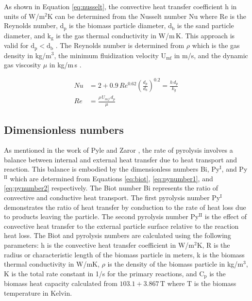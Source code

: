 As shown in Equation \ref{eq:nusselt}, the convective heat transfer coefficient h in units of W/m$^2$K can be determined from the Nusselt number Nu where Re is the Reynolds number, d$_\text{p}$ is the biomass particle diameter, d$_\text{b}$ is the sand particle diameter, and k$_\text{g}$ is the gas thermal conductivity in W/m\,K. This approach is valid for $\text{d}_\text{p} < \text{d}_\text{b}$ \cite{Collier-2004}. The Reynolds number is determined from $\rho$ which is the gas density in kg/m$^3$, the minimum fluidization velocity U$_\text{mf}$ in m/s, and the dynamic gas viscosity $\mu$ in kg/m\,s \cite{Papadikis-2010}.

\begin{align}
    Nu &= 2 + 0.9\, Re^{0.62} \left(\frac{d_p}{d_b}\right)^{0.2} = \frac{h\, d_p}{k_g} \label{eq:nusselt} \\
    Re &= \frac{\rho\, U_{mf}\, d_p}{\mu}
\end{align}


\subsection{Dimensionless numbers}

As mentioned in the work of Pyle and Zaror \cite{Pyle-1984}, the rate of pyrolysis involves a balance between internal and external heat transfer due to heat transport and reaction. This balance is embodied by the dimensionless numbers Bi, Py$^\text{I}$, and Py$^\text{II}$ which are determined from Equations \ref{eq:biot}, \ref{eq:pynumber1}, and \ref{eq:pynumber2} respectively. The Biot number Bi represents the ratio of convective and conductive heat transport. The first pyrolysis number Py$^\text{I}$ demonstrates the ratio of heat transfer by conduction to the rate of heat loss due to products leaving the particle. The second pyrolysis number Py$^\text{II}$ is the effect of convective heat transfer to the external particle surface relative to the reaction heat loss. The Biot and pyrolysis numbers are calculated using the following parameters: h is the convective heat transfer coefficient in W/m$^2$K, R is the radius or characteristic length of the biomass particle in meters, k is the biomass thermal conductivity in W/mK, $\rho$ is the density of the biomass particle in kg/m$^3$, K is the total rate constant in 1/s for the primary reactions, and C$_\text{p}$ is the biomass heat capacity calculated from $103.1 + 3.867\,\text{T}$ where T is the biomass temperature in Kelvin.

